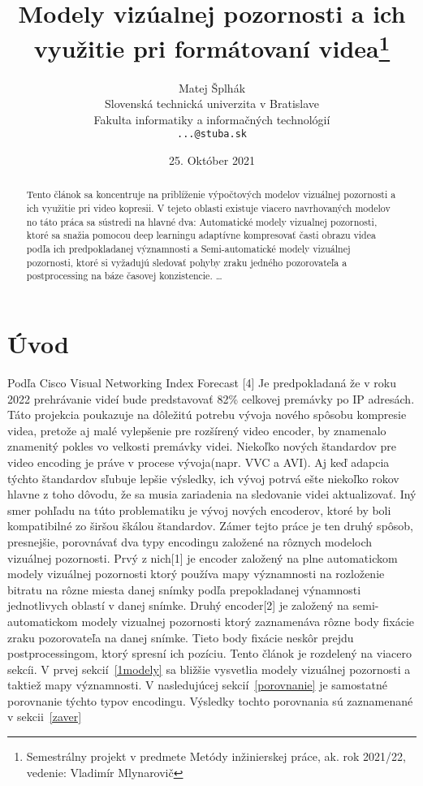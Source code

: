 \documentclass[10pt,twoside,slovak,a4paper]{article}
\title{Modely vizúalnej pozornosti a ich využitie pri formátovaní videa\thanks{Semestrálny projekt v predmete Metódy inžinierskej práce, ak. rok 2021/22, vedenie: Vladimír Mlynarovič}} %
\author{Matej Šplhák\\[2pt]
	{\small Slovenská technická univerzita v Bratislave}\\
	{\small Fakulta informatiky a informačných technológií}\\
	{\small \texttt{...@stuba.sk}}
	}
\date{\small 25. Október 2021} %
\begin{document}
\maketitle

\begin{abstract}
Tento článok sa koncentruje na priblíženie výpočtových modelov vizuálnej pozornosti a ich využitie pri video kopresii. V tejeto oblasti existuje viacero navrhovaných modelov no táto práca sa sústredi na hlavné dva: Automatické modely vizualnej pozornosti, ktoré sa snažia pomocou deep learningu adaptívne kompresovať časti obrazu videa podľa ich predpokladanej významnosti a Semi-automatické modely vizuálnej pozornosti, ktoré  si vyžadujú sledovať pohyby zraku jedného pozorovateľa a postprocessing na báze časovej konzistencie. 
\ldots
\end{abstract}



\section{Úvod}
Podľa Cisco  Visual  Networking  Index  Forecast [4] Je predpokladaná že v roku 2022 prehrávanie videí bude predstavovať 82\% celkovej premávky po IP adresách. Táto projekcia poukazuje na dôležitú potrebu vývoja nového spôsobu kompresie videa, pretože aj malé vylepšenie pre rozšírený video encoder, by znamenalo znamenitý pokles vo velkosti premávky videi. Niekoľko nových štandardov pre video encoding je práve v procese vývoja(napr. VVC a AVI). Aj keď adapcia týchto štandardov sľubuje lepšie výsledky, ich vývoj potrvá ešte niekoľko rokov hlavne z toho dôvodu, že sa musia zariadenia na sledovanie videi aktualizovať. Iný smer pohľadu na túto problematiku je vývoj nových encoderov, ktoré by boli kompatibilné zo širšou škálou štandardov. Zámer tejto práce je ten druhý spôsob, presnejšie, porovnávať dva typy encodingu založené na rôznych modeloch vizuálnej pozornosti. Prvý z nich[1] je encoder založený na plne automatickom modely vizuálnej pozornosti ktorý používa mapy významnosti na rozloženie bitratu na rôzne miesta danej snímky podľa prepokladanej výnamnosti jednotlivych oblastí v danej snímke. Druhý encoder[2] je založený na semi-automatickom modely vizualnej pozornosti ktorý zaznamenáva rôzne body fixácie zraku pozorovateľa na danej snímke. Tieto body fixácie neskôr prejdu postprocessingom, ktorý spresní ich pozíciu. Tento článok je rozdelený na viacero sekcíi. V prvej sekcií~\ref{1modely} sa bližšie vysvetlia modely vizuálnej pozornosti a taktiež mapy významnosti. V nasledujúcej sekcií~\ref{porovnanie} je samostatné porovnanie týchto typov encodingu. Výsledky tochto porovnania sú zaznamenané v sekcii~\ref{zaver}   
\end{document}
